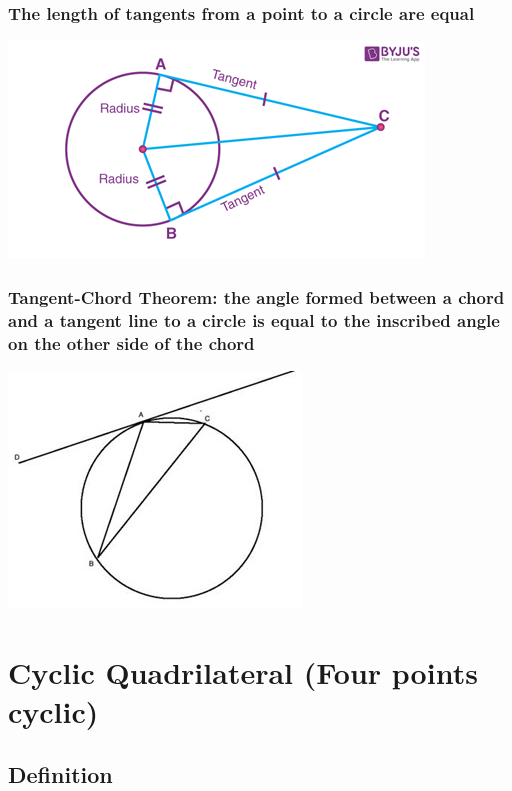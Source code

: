 \documentclass{article}
\begin{document}
\subsubsection{The length of tangents from a point to a circle are equal}

\includegraphics{Picture7.png}

\vspace{50px}

\subsubsection{Tangent-Chord Theorem: the angle formed between a chord and a tangent line to a circle is equal to the inscribed angle on the other side of the chord}

\includegraphics{Picture8.jpg}

\pagebreak

\section{Cyclic Quadrilateral (Four points cyclic)}

\subsection{Definition}

\vspace{20px}
\end{document}
